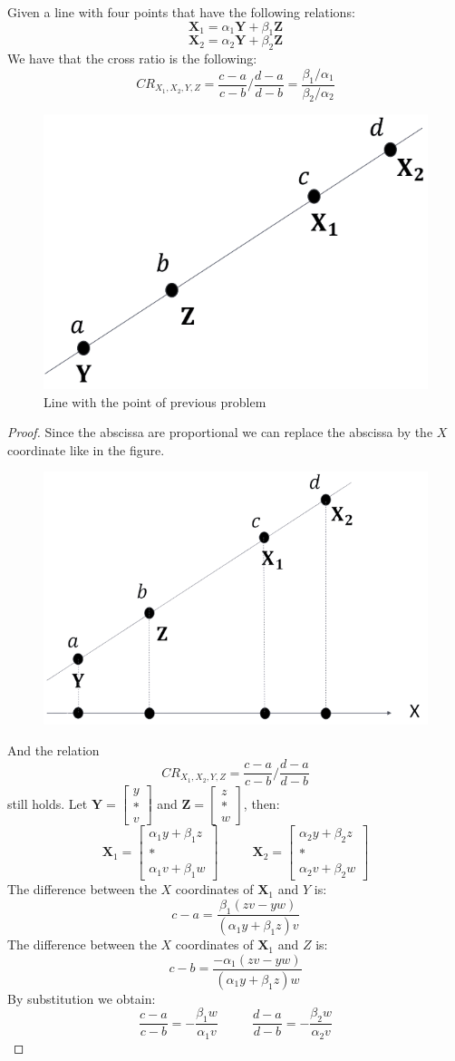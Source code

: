 \documentclass[12pt, a4paper]{report}
\begin{document}
    Given a line with four points that have the following relations: 
    \[\boldsymbol{X}_1=\alpha_1\boldsymbol{Y}+\beta_1\boldsymbol{Z}\]
    \[\boldsymbol{X}_2=\alpha_2\boldsymbol{Y}+\beta_2\boldsymbol{Z}\]
    We have that the cross ratio is the following: 
    \[CR_{X_1,X_2,Y,Z}=\dfrac{c-a}{c-b}/\dfrac{d-a}{d-b}=\dfrac{\beta_1/\alpha_1}{\beta_2/\alpha_2}\]
    \begin{figure}[H]
        \centering
        \includegraphics[width=0.25\linewidth]{images/line.png}
        \caption{Line with the point of previous problem}
    \end{figure}
    \begin{proof}
        Since the abscissa are proportional we can replace the abscissa by the $X$ coordinate like in the figure. 
        \begin{figure}[H]
            \centering
            \includegraphics[width=0.4\linewidth]{images/abscissae.png}
        \end{figure}
        And the relation 
        \[CR_{X_1,X_2,Y,Z}=\dfrac{c-a}{c-b}/\dfrac{d-a}{d-b}\]
        still holds. Let $\boldsymbol{Y}=\begin{bmatrix} y \\ * \\ v \end{bmatrix}$ and $\boldsymbol{Z}=\begin{bmatrix} z \\ * \\ w \end{bmatrix}$, then: 
        \[ \boldsymbol{X}_1=\begin{bmatrix} \alpha_1y+\beta_1z \\ * \\ \alpha_1v+\beta_1w \end{bmatrix} \:\:\:\:\:\:\:\:\:\:\:\:
        \boldsymbol{X}_2=\begin{bmatrix} \alpha_2y+\beta_2z \\ * \\ \alpha_2v+\beta_2w \end{bmatrix}\]
        The difference between the $X$ coordinates of $\boldsymbol{X}_1$ and $Y$ is:
        \[c-a=\dfrac{\beta_1(zv-yw)}{(\alpha_1y+\beta_1z)v}\]
        The difference between the $X$ coordinates of $\boldsymbol{X}_1$ and $Z$ is:
        \[c-b=\dfrac{-\alpha_1(zv-yw)}{(\alpha_1y+\beta_1z)w}\]
        By substitution we obtain: 
        \[ \dfrac{c-a}{c-b}=-\dfrac{\beta_1w}{\alpha_1v} \:\:\:\:\:\:\:\:\:\:\:\: \dfrac{d-a}{d-b}=-\dfrac{\beta_2w}{\alpha_2v}\]
    \end{proof}
\end{document}
